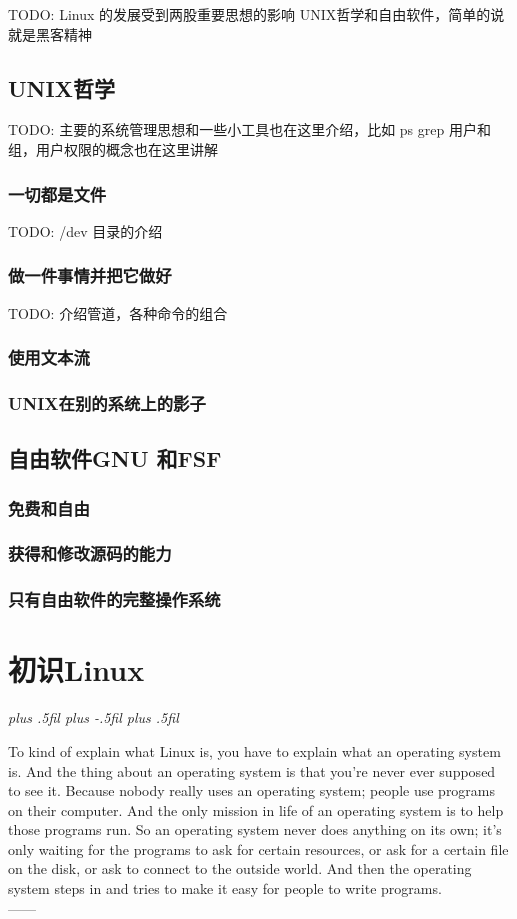\documentclass[amstex]{ctexbook}
\newcommand{\RTLpar}{%
  \leftskip=0pt plus .5fil%
  \rightskip=0pt plus -.5fil%
  \parfillskip=0pt plus .5fil%
}
\newenvironment{quotes}[2][0.55]{\pushQED{#2}%
\begin{flushright}%
\begin{minipage}{#1\textwidth}\begin{flushright}\noindent\it\RTLpar}{%
 \\------\popQED{}\end{flushright}\end{minipage}\end{flushright}}%
\begin{document}
TODO:  Linux 的发展受到两股重要思想的影响 UNIX哲学和自由软件，简单的说就是黑客精神

\section{UNIX哲学}

TODO:  主要的系统管理思想和一些小工具也在这里介绍，比如 ps grep 用户和组，用户权限的概念也在这里讲解

\subsection{一切都是文件}

TODO:  /dev 目录的介绍

\subsection{做一件事情并把它做好}
TODO: 介绍管道，各种命令的组合
\subsection{使用文本流}
\subsection{UNIX在别的系统上的影子}

\section{自由软件GNU 和FSF}
\subsection{免费和自由}
\subsection{获得和修改源码的能力}
\subsection{只有自由软件的完整操作系统}

\chapter{初识Linux}

\begin{quotes}[0.63]{Linus~Torvalds}
To kind of explain what Linux is, you have to explain what an operating system is. And the thing about an operating system is that you're never ever supposed to see it. Because nobody really uses an operating system; people use programs on their computer. And the only mission in life of an operating system is to help those programs run. So an operating system never does anything on its own; it's only waiting for the programs to ask for certain resources, or ask for a certain file on the disk, or ask to connect to the outside world. And then the operating system steps in and tries to make it easy for people to write programs.
\end{quotes}
\end{document}
